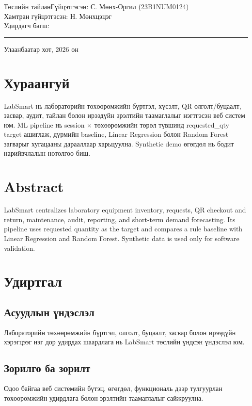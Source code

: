 \documentclass[12pt,a4paper,oneside]{report}
\begin{document}
\begin{titlepage}\vspace{.5cm}{\large ПРОГРАММ ХАНГАМЖИЙН ХӨТӨЛБӨР\par}\vspace{2.5cm}{\LARGE\bfseries LABSMART\par}\vspace{.5cm}{\Large Лабораторийн төхөөрөмжийн удирдлага, ашиглалтын бүртгэл ба ирээдүйн хэрэгцээний таамаглал бүхий веб систем\par}\vspace{1cm}Төслийн тайлан\vfill Гүйцэтгэсэн: С. Мөнх-Оргил (23B1NUM0124)\\Хамтран гүйцэтгэсэн: Н. Мөнхцэцэг\\Удирдагч багш: \rule{6cm}{.4pt}\vfill Улаанбаатар хот, 2026 он\end{titlepage}
\chapter*{Хураангуй}LabSmart нь лабораторийн төхөөрөмжийн бүртгэл, хүсэлт, QR олголт/буцаалт, засвар, аудит, тайлан болон ирээдүйн эрэлтийн таамаглалыг нэгтгэсэн веб систем юм. ML pipeline нь session × төхөөрөмжийн төрөл түвшинд requested\_qty target ашиглаж, дүрмийн baseline, Linear Regression болон Random Forest загварыг хугацааны дарааллаар харьцуулна. Synthetic demo өгөгдөл нь бодит нарийвчлалын нотолгоо биш.\chapter*{Abstract}LabSmart centralizes laboratory equipment inventory, requests, QR checkout and return, maintenance, audit, reporting, and short-term demand forecasting. Its pipeline uses requested quantity as the target and compares a rule baseline with Linear Regression and Random Forest. Synthetic data is used only for software validation.\tableofcontents\listoffigures\listoftables\clearpage{}
\chapter{Удиртгал}\section{Асуудлын үндэслэл}Лабораторийн төхөөрөмжийн бүртгэл, олголт, буцаалт, засвар болон ирээдүйн хэрэгцээг нэг дор удирдах шаардлага нь LabSmart төслийн үндсэн үндэслэл юм.\section{Зорилго ба зорилт}Одоо байгаа веб системийн бүтэц, өгөгдөл, функциональ дээр тулгуурлан төхөөрөмжийн удирдлага болон эрэлтийн таамаглалыг сайжруулна.
\end{document}
